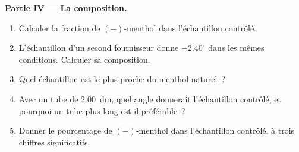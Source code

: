 \begin{problem}
\medskip
\noindent\textbf{Partie IV --- La composition.}
\begin{enumerate}[resume]
  \item Calculer la fraction de $(-)$-menthol dans l'échantillon contrôlé.
  \item L'échantillon d'un second fournisseur donne $-2.40^\circ$ dans
        les mêmes conditions. Calculer sa composition.
  \item Quel échantillon est le plus proche du menthol naturel~?
  \item Avec un tube de \qty{2.00}{dm}, quel angle donnerait
        l'échantillon contrôlé, et pourquoi un tube plus long est-il
        préférable~?
  \item Donner le pourcentage de $(-)$-menthol dans l'échantillon
        contrôlé, à trois chiffres significatifs.
\end{enumerate}
\end{problem}
